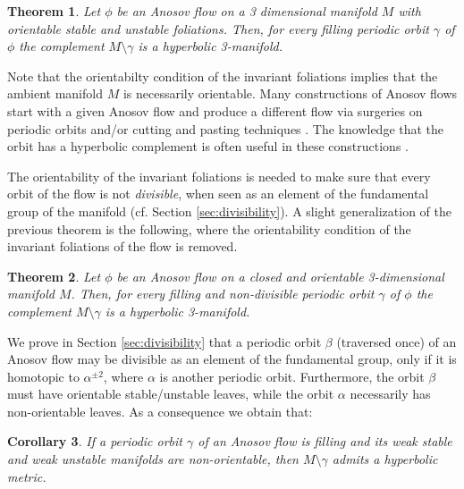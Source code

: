 \documentclass[12pt]{amsart}
\newtheorem{theorem}{Theorem}[section]
\newtheorem{corollary}[theorem]{Corollary}
\theoremstyle{definition}
\theoremstyle{remark}
\begin{document}
\begin{theorem}\label{thm: orbits are hyperbolic for orientable foliations}
Let $\phi$ be an Anosov flow on a 3 dimensional manifold $M$ with orientable stable and unstable foliations. Then, for every filling periodic orbit $\gamma$ of $\phi$ the complement $M\setminus\gamma$ is a hyperbolic 3-manifold.
\end{theorem}


Note that the orientabilty condition of the invariant foliations implies that the ambient manifold $M$ is necessarily orientable. Many constructions of Anosov flows start with a given Anosov flow and produce a different flow via surgeries on periodic orbits and/or cutting and pasting techniques \cite{BonattiIakovoglou2023, FranksWilliams1989, HandelThurston1980}. The knowledge that the orbit has a hyperbolic complement is often useful in these constructions \cite{FoulonHasselblatt2013Contact,BowdenMann2022Stability}.

The orientability of the invariant foliations is needed to make sure that every orbit of the flow is not \emph{divisible}, when seen as an element of the fundamental group of the manifold (cf. Section \ref{sec:divisibility}). A slight generalization of the previous theorem is the following, where the orientability condition of the invariant foliations of the flow is removed. 

\begin{theorem}
\label{thm: orbits are hyperbolic when not divisible}
Let $\phi$ be an Anosov flow on a closed and orientable 3-dimensional manifold $M$. Then, for every filling and non-divisible periodic orbit $\gamma$ of $\phi$ the complement $M\setminus\gamma$ is a hyperbolic 3-manifold.
\end{theorem}

We prove in Section \ref{sec:divisibility} that a periodic orbit $\beta$ (traversed once) of an Anosov flow may be divisible as an element of the fundamental group, only if it is homotopic to $\alpha^{\pm2}$, where $\alpha$ is another periodic orbit. Furthermore, the orbit $\beta$ must have orientable stable/unstable leaves, while the orbit $\alpha$ necessarily has non-orientable leaves. As a consequence we obtain that:


\begin{corollary}
\label{cor:main}
If a periodic orbit $\gamma$ of an Anosov flow is filling and its weak stable and weak unstable manifolds are non-orientable, then $M\setminus\gamma$ admits a hyperbolic metric.
\end{corollary}
\end{document}
